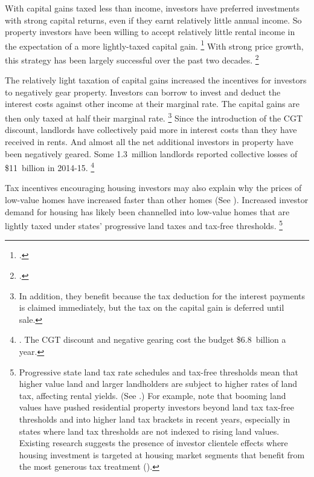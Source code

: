 With capital gains taxed less than income, investors have preferred investments with strong capital returns, even if they earnt relatively little annual income.
So property investors have been willing to accept relatively little rental income in the expectation of a more lightly-taxed capital gain.%
	\footcites{RBA2015SubmissionHomeOwnershipInquiry}{DaleyWood2016-Negative-Gearing-CGT}
With strong price growth, this strategy has been largely successful over the past two decades.%
	\footcite[][9]{DaleyWood2016-Negative-Gearing-CGT}

The relatively light taxation of capital gains increased the incentives for investors to negatively gear property.
Investors can borrow to invest and deduct the interest costs against other income at their marginal rate.
The capital gains are then only taxed at half their marginal rate.%
    \footnote{In addition, they benefit because the tax deduction for the interest payments is claimed immediately,
    but the tax on the capital gain is deferred until sale.}
Since the introduction of the CGT discount, landlords have collectively paid more in interest costs than they have received in rents.
And almost all the net additional investors in property have been negatively geared.
Some 1.3~million landlords reported collective losses of \$11~billion in 2014-15.%
	\footnote{\textcite[][9, 25--26]{DaleyWood2016-Negative-Gearing-CGT}. The CGT discount and negative gearing cost the budget \$6.8~billion a year.}

Tax incentives encouraging housing investors may also explain why the prices of low-value homes have increased faster than other homes (See ). Increased investor demand for housing has likely been channelled into low-value homes that are lightly taxed under states' progressive land taxes and tax-free thresholds.%
    \footnote{Progressive state land tax rate schedules and tax-free thresholds mean that higher value land and larger landholders are subject to higher rates of land tax, affecting rental yields.
    (See .)
    For example, \textcite[][21]{Wood-Ong-AHURI-2010-factors-affecting-landlords} note that booming land values have pushed residential property investors beyond land tax tax-free thresholds and into higher land tax brackets in recent years, especially in states where land tax thresholds are not indexed to rising land values. Existing research suggests the presence of investor clientele effects where housing investment is targeted at housing market segments that benefit from the most generous tax treatment (\textcite{Wood-Tu-2004-investor-clienteles-rental-housing}).}


